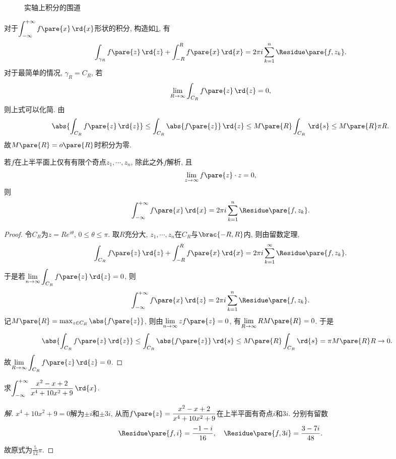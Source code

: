 \documentclass{ctexart}
\begin{document}
\begin{figure}[ht]
    \centering
    \caption{实轴上积分的围道}
    \label{fig:实轴上积分的围道}
\end{figure}
对于$\displaystyle \int_{-\infty}^{+\infty}f\pare{x}\,\rd{x}$形状的积分, 构造如\cref{fig:实轴上积分的围道}, 有
\[ \int_{\gamma_R} f\pare{z}\,\rd{z} + \int_{-R}^R f\pare{x}\,\rd{x} = 2\pi i \sum_{k=1}^n \Residue\pare{f,z_k}. \]
对于最简单的情况, $\gamma_R = C_R$, 若
\[ \lim_{R\rightarrow\infty} \int_{C_R}f\pare{z}\,\rd{z} = 0, \]
则上式可以化简. 由
\[ \abs{\int_{C_R} f\pare{z}\,\rd{z}} \le \int_{C_R} \abs{f\pare{z}}\,\rd{z} \le M\pare{R}\int_{C_R}\,\rd{s} \le M\pare{R}\pi R. \]
故$M\pare{R} = o\pare{R}$时积分为零.
\begin{theorem}
    若$f$在上半平面上仅有有限个奇点$z_1,\cdots, z_n$, 除此之外$f$解析, 且
    \[ \lim_{z\rightarrow \infty} f\pare{z}\cdot z = 0, \]
    则
    \[ \int_{-\infty}^{+\infty} f\pare{x}\,\rd{x} = 2\pi i \sum_{k=1}^n \Residue\pare{f,z_k}. \]
\end{theorem}
\begin{proof}
    令$C_R$为$z = Re^{i\theta}$, $0\le\theta\le \pi$. 取$R$充分大, $z_1,\cdots, z_n$在$C_R$与$\brac{-R,R}$内, 则由留数定理,
    \[ \int_{C_R} f\pare{z}\,\rd{z} + \int_{-R}^R f\pare{x}\,\rd{x} = 2\pi i \sum_{k=1}^\infty\Residue\pare{f,z_k}. \]
    于是若$\displaystyle \lim_{n\rightarrow\infty}\int_{C_R}f\pare{z}\,\rd{z} = 0$, 则
    \[ \int_{-\infty}^{+\infty} f\pare{x}\,\rd{z} = 2\pi i \sum_{k=1}^n \Residue\pare{f,z_k}. \]
    记$M\pare{R} = \max_{z\in C_R}\abs{f\pare{z}}$, 则由$\displaystyle \lim_{n\rightarrow\infty} zf\pare{z} = 0$, 有$\displaystyle \lim_{R\rightarrow \infty} RM\pare{R} = 0$.
    于是
    \begin{align*}
        \abs{\int_{C_R}f\pare{z}\,\rd{z}} &\le \int_{C_R}\abs{f\pare{z}}\,\rd{s} \le M\pare{R}\int_{C_R}\rd{s} = \pi M\pare{R} R \rightarrow 0.
    \end{align*}
    故$\displaystyle \lim_{R\rightarrow\infty} \int_{C_R} f\pare{z}\,\rd{z} = 0$.
\end{proof}
\begin{sample}
    \begin{ex}
        求$\displaystyle \int_{-\infty}^{+\infty} \frac{x^2-x+2}{x^4+10x^2+9}\,\rd{x}$.
    \end{ex}
    \begin{proof}[解]
        $x^4 + 10x^2 + 9 = 0$解为$\pm i$和$\pm 3 i$, 从而$f\pare{z} = \displaystyle \frac{x^2-x+2}{x^4+10x^2+9}$在上半平面有奇点$i$和$3i$. 分别有留数
        \[ \Residue\pare{f,i} = \frac{-1-i}{16},\quad \Residue\pare{f,3i} = \frac{3-7i}{48}. \]
        故原式为$\displaystyle \frac{5}{12}\pi$.
    \end{proof}
\end{sample}
\end{document}
